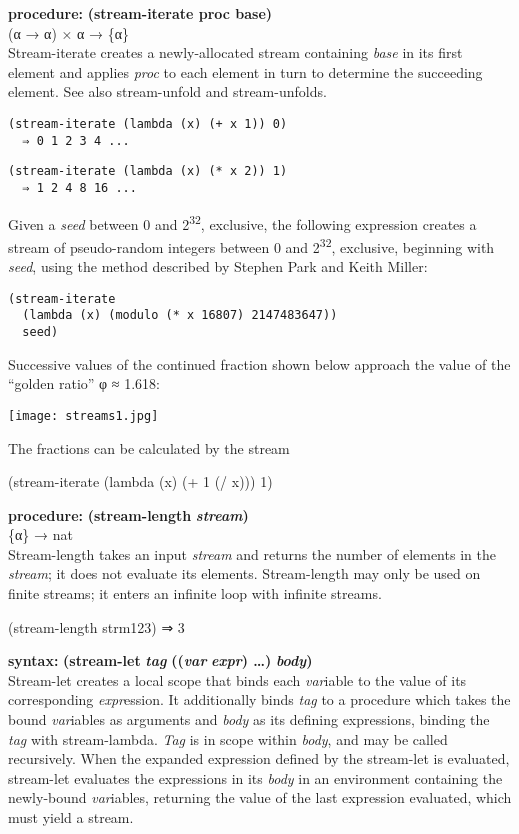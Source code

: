 \textbf{procedure:} \textbf{(stream-iterate proc base)}\\
(α → α) × α → \{α\}\\
Stream-iterate creates a newly-allocated stream containing \emph{base}
in its first element and applies \emph{proc} to each element in turn to
determine the succeeding element. See also stream-unfold and
stream-unfolds.

\begin{verbatim}
(stream-iterate (lambda (x) (+ x 1)) 0)
  ⇒ 0 1 2 3 4 ...
\end{verbatim}

\begin{verbatim}
(stream-iterate (lambda (x) (* x 2)) 1)
  ⇒ 1 2 4 8 16 ...
\end{verbatim}

Given a \emph{seed} between 0 and 2\textsuperscript{32}, exclusive, the
following expression creates a stream of pseudo-random integers between
0 and 2\textsuperscript{32}, exclusive, beginning with \emph{seed},
using the method described by Stephen Park and Keith Miller:

\begin{verbatim}
(stream-iterate
  (lambda (x) (modulo (* x 16807) 2147483647))
  seed)
\end{verbatim}

Successive values of the continued fraction shown below approach the
value of the ``golden ratio'' φ ≈ 1.618:

\texttt{[image: streams1.jpg]}

The fractions can be calculated by the stream

(stream-iterate (lambda (x) (+ 1 (/ x))) 1)

\textbf{procedure:} \textbf{(stream-length} \textbf{\emph{stream})}\\
\{α\} → nat\\
Stream-length takes an input \emph{stream} and returns the number of
elements in the \emph{stream}; it does not evaluate its elements.
Stream-length may only be used on finite streams; it enters an infinite
loop with infinite streams.

(stream-length strm123) ⇒ 3

\textbf{syntax:} \textbf{(stream-let} \textbf{\emph{tag}}
\textbf{((\emph{var}} \textbf{} \textbf{\emph{expr}) \ldots{})}
\textbf{\emph{body})}\\
Stream-let creates a local scope that binds each \emph{var}iable \emph{}
to the value of its corresponding \emph{expr}ession. It additionally
binds \emph{tag} to a procedure which takes the bound \emph{var}iables
as arguments and \emph{body} as its defining expressions, binding the
\emph{tag} with stream-lambda. \emph{Tag} is in scope within
\emph{body}, and may be called recursively. When the expanded expression
defined by the stream-let is evaluated, stream-let evaluates the
expressions in its \emph{body} in an environment containing the
newly-bound \emph{var}iables, returning the value of the last expression
evaluated, which must yield a stream.

